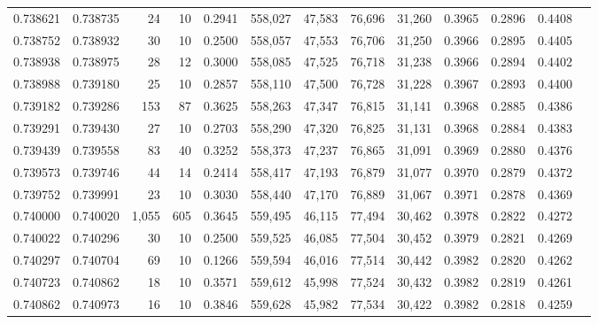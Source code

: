 \begin{tabular}{rrrrrrrrrrrrr}
0.738621 & 0.738735 &    24 &  10 &                                     0.2941 & 558,027 &  47,583 &  76,696 &  31,260 & 0.3965 & 0.2896 & 0.4408 \\
0.738752 & 0.738932 &    30 &  10 &                                     0.2500 & 558,057 &  47,553 &  76,706 &  31,250 & 0.3966 & 0.2895 & 0.4405 \\
0.738938 & 0.738975 &    28 &  12 &                                     0.3000 & 558,085 &  47,525 &  76,718 &  31,238 & 0.3966 & 0.2894 & 0.4402 \\
0.738988 & 0.739180 &    25 &  10 &                                     0.2857 & 558,110 &  47,500 &  76,728 &  31,228 & 0.3967 & 0.2893 & 0.4400 \\
0.739182 & 0.739286 &   153 &  87 &                                     0.3625 & 558,263 &  47,347 &  76,815 &  31,141 & 0.3968 & 0.2885 & 0.4386 \\
0.739291 & 0.739430 &    27 &  10 &                                     0.2703 & 558,290 &  47,320 &  76,825 &  31,131 & 0.3968 & 0.2884 & 0.4383 \\
0.739439 & 0.739558 &    83 &  40 &                                     0.3252 & 558,373 &  47,237 &  76,865 &  31,091 & 0.3969 & 0.2880 & 0.4376 \\
0.739573 & 0.739746 &    44 &  14 &                                     0.2414 & 558,417 &  47,193 &  76,879 &  31,077 & 0.3970 & 0.2879 & 0.4372 \\
0.739752 & 0.739991 &    23 &  10 &                                     0.3030 & 558,440 &  47,170 &  76,889 &  31,067 & 0.3971 & 0.2878 & 0.4369 \\
0.740000 & 0.740020 & 1,055 & 605 &                                     0.3645 & 559,495 &  46,115 &  77,494 &  30,462 & 0.3978 & 0.2822 & 0.4272 \\
0.740022 & 0.740296 &    30 &  10 &                                     0.2500 & 559,525 &  46,085 &  77,504 &  30,452 & 0.3979 & 0.2821 & 0.4269 \\
0.740297 & 0.740704 &    69 &  10 &                                     0.1266 & 559,594 &  46,016 &  77,514 &  30,442 & 0.3982 & 0.2820 & 0.4262 \\
0.740723 & 0.740862 &    18 &  10 &                                     0.3571 & 559,612 &  45,998 &  77,524 &  30,432 & 0.3982 & 0.2819 & 0.4261 \\
0.740862 & 0.740973 &    16 &  10 &                                     0.3846 & 559,628 &  45,982 &  77,534 &  30,422 & 0.3982 & 0.2818 & 0.4259 \\

\end{tabular}
